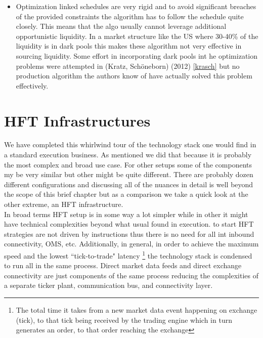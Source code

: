 \begin{itemize}
\item Optimization linked schedules are very rigid and to avoid significant breaches of the provided constraints the algorithm has to follow the schedule quite closely. This means that the algo usually cannot leverage additional opportunistic liquidity. In a market structure like the US where 30-40\% of the liquidity is in dark pools this makes these algorithm not very effective in sourcing liquidity. Some effort in incorporating dark pools int he optimization problems were attempted in (Kratz, Sch{\"o}neborn) (2012) \ref{krasch} but no production algorithm the authors know of have actually solved this problem effectively. 
\end{itemize}


\section{HFT Infrastructures}
We have completed this  whirlwind tour of the technology stack one would find in a standard execution business. As mentioned we did  that because it is probably the most complex and broad use case.  For other setups some of the components my be very  similar but other might be quite different. There are probably dozen different configurations and discussing all of the nuances in detail is well beyond the scope of this brief chapter but as a comparison we take a quick look at the other extreme, an HFT infrastructure.\\

In broad terms HFT setup is in some way a lot simpler while in other it might have technical complexities beyond what usual found in execution.  to start HFT strategies are not driven by  instructions thus  there is no need for all int inbound connectivity, OMS, etc.  Additionally, in general, in order to achieve the maximum speed and the lowest  ``tick-to-trade" latency \footnote{The total time it takes from a new market data event happening on exchange (tick), to that tick being received by the trading engine which in turn generates an order, to that order reaching the exchange} the technology stack is condensed to run all in the same process. Direct market data feeds and direct exchange connectivity are just components of the same process reducing the complexities of a separate ticker plant, communication bus, and connectivity layer. \\

